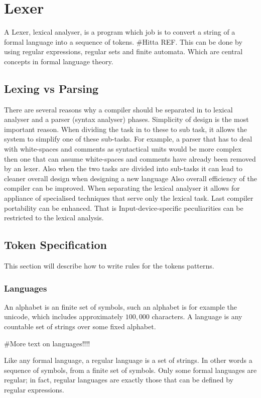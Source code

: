 \chapter{Lexer}
A Lexer, lexical analyser, is a program which job is to convert a string of a
formal language into a sequence of tokens. \#Hitta REF.
This can be done by using regular expressions, regular sets and finite
automata. Which are central concepts in formal language theory. \cite{Aho1990}
\section{Lexing vs Parsing}
There are several reasons why a compiler should be separated in to lexical 
analyser and a parser (syntax analyser) phases. Simplicity of design is the most
important reason. When dividing the task in to these to sub task, it allows the
system to simplify one of these sub-tasks. For example, a parser that has to 
deal with white-spaces and comments as syntactical units would be more complex 
then one that can assume white-spaces and comments have already been removed by 
an lexer. Also when the two tasks are divided into sub-tasks it can lead to 
cleaner overall design when designing a new language \cite{Aho2006}
Also overall efficiency of the compiler can be improved. When separating the 
lexical analyser it allows for appliance of specialised techniques that serve 
only the lexical task. \cite{Aho2006}
Last compiler portability can be enhanced. That is Input-device-specific 
peculiarities can be restricted to the lexical analysis. \cite{Aho2006}
\section{Token Specification}
This section will describe how to write rules for the tokens patterns. 
\subsection{Languages}
An alphabet is an finite set of symbols, such an alphabet is for example the 
unicode, which includes approximately $100,000$ characters. A language is any 
countable set of strings over some fixed alphabet. \cite{Aho2006}

\#More text on languages!!!!

Like any formal language, a regular language is a set of strings. In other 
words a sequence of symbols,
from a finite set of symbols. Only some formal languages are regular; in fact, 
regular languages are exactly those that can be defined by regular expressions.
\cite{Ranta2012}
